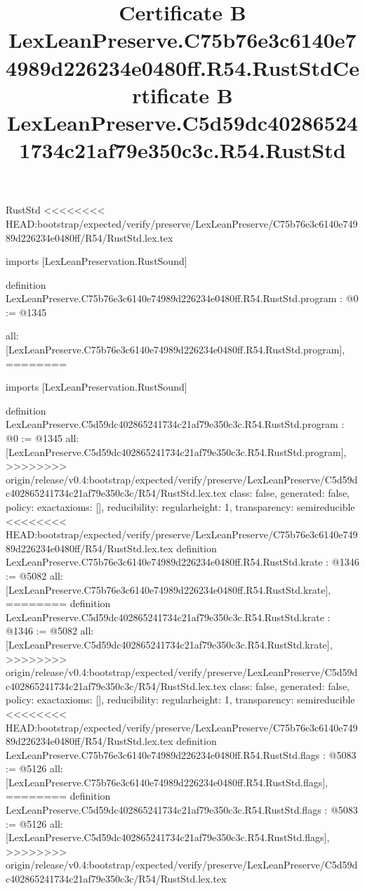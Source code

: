 \begin{lexlean}{RustStd}
<<<<<<<< HEAD:bootstrap/expected/verify/preserve/LexLeanPreserve/C75b76e3c6140e74989d226234e0480ff/R54/RustStd.lex.tex
\title{Certificate B LexLeanPreserve.C75b76e3c6140e74989d226234e0480ff.R54.RustStd}
\begin{coremodule}
imports [LexLeanPreservation.RustSound]

definition LexLeanPreserve.C75b76e3c6140e74989d226234e0480ff.R54.RustStd.program : @0 := @1345 {
  all: [LexLeanPreserve.C75b76e3c6140e74989d226234e0480ff.R54.RustStd.program],
========
\title{Certificate B LexLeanPreserve.C5d59dc402865241734c21af79e350c3c.R54.RustStd}
\begin{coremodule}
imports [LexLeanPreservation.RustSound]

definition LexLeanPreserve.C5d59dc402865241734c21af79e350c3c.R54.RustStd.program : @0 := @1345 {
  all: [LexLeanPreserve.C5d59dc402865241734c21af79e350c3c.R54.RustStd.program],
>>>>>>>> origin/release/v0.4:bootstrap/expected/verify/preserve/LexLeanPreserve/C5d59dc402865241734c21af79e350c3c/R54/RustStd.lex.tex
  class: false,
  generated: false,
  policy: exact{axioms: []},
  reducibility: regular{height: 1},
  transparency: semireducible
}
<<<<<<<< HEAD:bootstrap/expected/verify/preserve/LexLeanPreserve/C75b76e3c6140e74989d226234e0480ff/R54/RustStd.lex.tex
definition LexLeanPreserve.C75b76e3c6140e74989d226234e0480ff.R54.RustStd.krate : @1346 := @5082 {
  all: [LexLeanPreserve.C75b76e3c6140e74989d226234e0480ff.R54.RustStd.krate],
========
definition LexLeanPreserve.C5d59dc402865241734c21af79e350c3c.R54.RustStd.krate : @1346 := @5082 {
  all: [LexLeanPreserve.C5d59dc402865241734c21af79e350c3c.R54.RustStd.krate],
>>>>>>>> origin/release/v0.4:bootstrap/expected/verify/preserve/LexLeanPreserve/C5d59dc402865241734c21af79e350c3c/R54/RustStd.lex.tex
  class: false,
  generated: false,
  policy: exact{axioms: []},
  reducibility: regular{height: 1},
  transparency: semireducible
}
<<<<<<<< HEAD:bootstrap/expected/verify/preserve/LexLeanPreserve/C75b76e3c6140e74989d226234e0480ff/R54/RustStd.lex.tex
definition LexLeanPreserve.C75b76e3c6140e74989d226234e0480ff.R54.RustStd.flags : @5083 := @5126 {
  all: [LexLeanPreserve.C75b76e3c6140e74989d226234e0480ff.R54.RustStd.flags],
========
definition LexLeanPreserve.C5d59dc402865241734c21af79e350c3c.R54.RustStd.flags : @5083 := @5126 {
  all: [LexLeanPreserve.C5d59dc402865241734c21af79e350c3c.R54.RustStd.flags],
>>>>>>>> origin/release/v0.4:bootstrap/expected/verify/preserve/LexLeanPreserve/C5d59dc402865241734c21af79e350c3c/R54/RustStd.lex.tex
}}}
\end{coremodule}}
\end{coremodule}
\end{lexlean}
